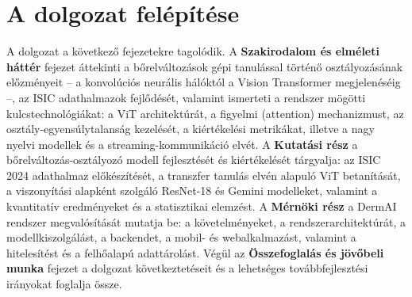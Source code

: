 \section{A dolgozat felépítése}

A dolgozat a következő fejezetekre tagolódik. A \textbf{Szakirodalom és elméleti
háttér} fejezet áttekinti a bőrelváltozások gépi tanulással történő
osztályozásának előzményeit -- a konvolúciós neurális hálóktól a Vision
Transformer megjelenéséig --, az ISIC adathalmazok fejlődését, valamint ismerteti
a rendszer mögötti kulcstechnológiákat: a ViT architektúrát, a figyelmi
(attention) mechanizmust, az osztály-egyensúlytalanság kezelését, a kiértékelési
metrikákat, illetve a nagy nyelvi modellek és a streaming-kommunikáció elvét.
A \textbf{Kutatási rész} a bőrelváltozás-osztályozó modell fejlesztését és
kiértékelését tárgyalja: az ISIC 2024 adathalmaz előkészítését, a transzfer
tanulás elvén alapuló ViT betanítását, a viszonyítási alapként szolgáló
ResNet-18
és Gemini modelleket, valamint a kvantitatív eredményeket és a statisztikai
elemzést. A \textbf{Mérnöki rész} a DermAI rendszer megvalósítását mutatja be:
a követelményeket, a rendszerarchitektúrát, a modellkiszolgálást, a backendet,
a mobil- és webalkalmazást, valamint a hitelesítést és a felhőalapú
adattárolást. Végül az \textbf{Összefoglalás és jövőbeli munka} fejezet a
dolgozat következtetéseit és a lehetséges továbbfejlesztési irányokat foglalja
össze.

